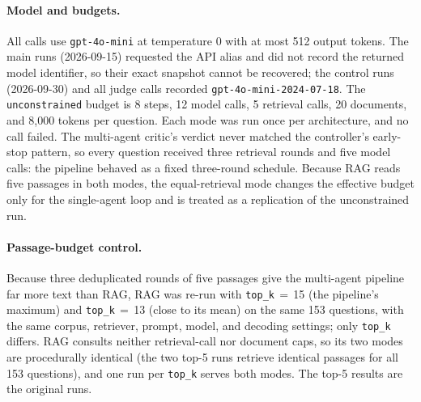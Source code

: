\documentclass[11pt,a4paper]{article}
\begin{document}
\paragraph{Model and budgets.}
All calls use \texttt{gpt-4o-mini} at temperature 0 with at most 512 output
tokens.
The main runs (2026-09-15) requested the API alias and did not record the
returned model identifier, so their exact snapshot cannot be recovered; the
control runs (2026-09-30) and all judge calls recorded
\texttt{gpt-4o-mini-2024-07-18}.
The \texttt{unconstrained} budget is 8 steps, 12 model calls, 5 retrieval
calls, 20 documents, and 8{,}000 tokens per question.
Each mode was run once per architecture, and no call failed.
The multi-agent critic's verdict never matched the controller's early-stop
pattern, so every question received three retrieval rounds and five model
calls: the pipeline behaved as a fixed three-round schedule.
Because RAG reads five passages in both modes, the equal-retrieval mode
changes the effective budget only for the single-agent loop and is treated as
a replication of the unconstrained run.

\paragraph{Passage-budget control.}
Because three deduplicated rounds of five passages give the multi-agent
pipeline far more text than RAG, RAG was re-run with \texttt{top\_k}\,$=$\,15
(the pipeline's maximum) and \texttt{top\_k}\,$=$\,13 (close to its mean)
on the same 153 questions, with the same corpus, retriever, prompt, model, and
decoding settings; only \texttt{top\_k} differs.
RAG consults neither retrieval-call nor document caps, so its two modes are
procedurally identical (the two top-5 runs retrieve identical passages for
all 153 questions), and one run per \texttt{top\_k} serves both modes.
The top-5 results are the original runs.
\end{document}
